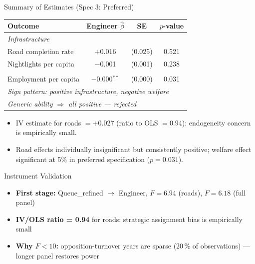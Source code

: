 \documentclass[aspectratio=169,10pt]{beamer}
\begin{document}
\begin{frame}{Summary of Estimates (Spec 3: Preferred)}
  \begin{center}
  \begin{tabular}{lccc}
    \toprule
    Outcome & Engineer $\hat\beta$ & SE & $p$-value \\
    \midrule
    \multicolumn{4}{l}{\textit{Infrastructure}} \\
    Road completion rate  & $+$0.016 & (0.025) & 0.521 \\
    Nightlights per capita & $-$0.001 & (0.001) & 0.238 \\
    \addlinespace
    \multicolumn{4}{l}{\textit{Welfare}} \\
    Employment per capita  & $-$0.000$^{**}$ & (0.000) & 0.031 \\
    \midrule
    \multicolumn{4}{l}{\textit{Sign pattern: positive infrastructure, negative welfare}} \\
    \multicolumn{4}{l}{\textit{Generic ability $\Rightarrow$ all positive — rejected}} \\
    \bottomrule
  \end{tabular}
  \end{center}
  \vspace{6pt}
  \begin{itemize}
    \item IV estimate for roads $= +0.027$ (ratio to OLS $= 0.94$):
          endogeneity concern is empirically small.
    \item Road effects individually insignificant but consistently positive;
          welfare effect significant at 5\% in preferred specification ($p = 0.031$).
  \end{itemize}
\end{frame}

\begin{frame}{Instrument Validation}
  \begin{center}
  \end{center}
  \vspace{4pt}
  \begin{itemize}\setlength\itemsep{5pt}
    \item \textbf{First stage:} Queue\_refined $\to$ Engineer,
          $F = 6.94$ (roads), $F = 6.18$ (full panel)
    \item \textbf{IV/OLS ratio = 0.94} for roads:
          strategic assignment bias is empirically small
    \item \textbf{Why $F < 10$:} opposition-turnover years are sparse
          (20\,\% of observations) --- longer panel restores power
  \end{itemize}
\end{frame}
\end{document}
